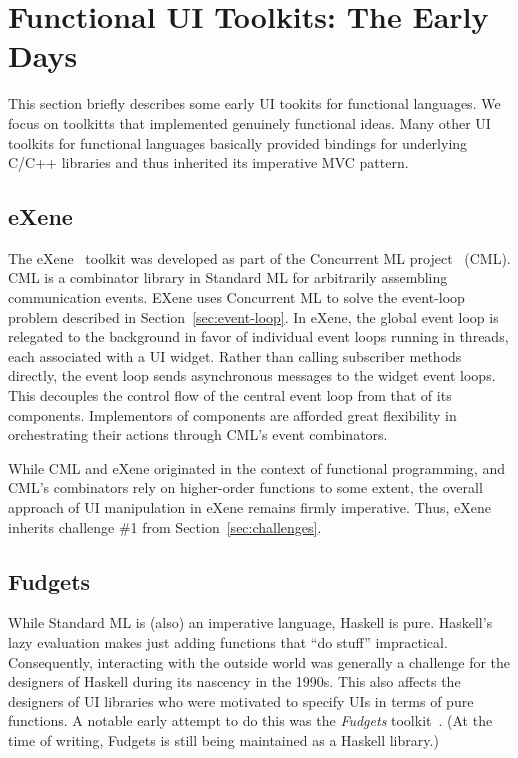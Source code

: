 \documentclass[sigplan,screen]{acmart}
\begin{document}
\section{Functional UI Toolkits: The Early Days}

This section briefly describes some early UI tookits for functional
languages.  We focus on toolkitts that implemented genuinely
functional ideas.  Many other UI toolkits for functional languages
basically provided bindings for underlying C/C++ libraries and thus
inherited its imperative MVC pattern.

\subsection{eXene}

The eXene~\cite{eXene} toolkit was developed as part of the Concurrent
ML project~\cite{ConcurrentML} (CML).  CML is a combinator library in
Standard ML for arbitrarily assembling communication events.  EXene
uses Concurrent ML to solve the event-loop problem described in
Section~\ref{sec:event-loop}.  In eXene, the global event loop is
relegated to the background in favor of individual event loops running
in threads, each associated with a UI widget.  Rather than calling
subscriber methods directly, the event loop sends asynchronous
messages to the widget event loops.  This decouples the control flow
of the central event loop from that of its components.  Implementors
of components are afforded great flexibility in orchestrating their
actions through CML's event combinators.

While CML and eXene originated in the context of functional
programming, and CML's combinators rely on higher-order functions to
some extent, the overall approach of UI manipulation in eXene remains
firmly imperative.  Thus, eXene inherits challenge \#1 from Section~\ref{sec:challenges}.

\subsection{Fudgets}

While Standard ML is (also) an imperative language, Haskell is pure.
Haskell's lazy evaluation makes just adding functions that ``do
stuff'' impractical.  Consequently, interacting with the outside world
was generally a challenge for the designers of Haskell during its
nascency in the 1990s.  This also affects the designers of UI
libraries who were motivated to specify UIs in terms of pure
functions.  A notable early attempt to do this was the
\textit{Fudgets} toolkit~\cite{Fudgets}.  (At the time of writing,
Fudgets is still being maintained as a Haskell library.)
\end{document}
